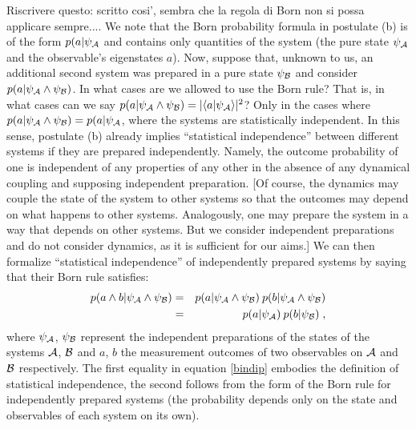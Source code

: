 \documentclass[aps,prl,amsmath,amssymb,twocolumn]{revtex4}
\theoremstyle{plain}
\theoremstyle{definition}
\theoremstyle{remark}
\def\>{\rangle}
\def\<{\langle}
\def\labell#1{\label{#1}}
\begin{document}
	Riscrivere questo: scritto cosi', sembra che la regola di Born non si possa applicare sempre....
	We note that the Born
	probability formula in postulate (b) is of the form $p(a|\psi_{\cal A}$ and contains only quantities of the
	system (the pure state $\psi_{\cal A}$ and the observable's eigenstates $a$). Now, suppose that, unknown to us, an additional second system was prepared in a pure state $\psi_{\cal B}$ and consider $p(a|\psi_{\cal A}\wedge \psi_{\cal B})$. In what cases are we allowed to use the Born rule? That is, in what cases can we say $p(a|\psi_{\cal A}\wedge \psi_{\cal B}) = |\<a|\psi_{\cal A}\>|^2$? Only in the cases where $p(a|\psi_{\cal A}\wedge \psi_{\cal B}) = p(a|\psi_{\cal A}$, where the systems  are statistically independent. In this sense, postulate (b) already implies  ``statistical independence'' between
	different systems if they are prepared independently. Namely, the
	outcome probability of one is independent of any properties of any
	other in the absence of any dynamical coupling and supposing
	independent preparation. [Of course, the dynamics may couple the state
	of the system to other systems so that the outcomes may depend on what
	happens to other systems.  Analogously, one may prepare the system in
	a way that depends on other systems. But we consider independent
	preparations and do not consider dynamics, as it is sufficient for our
	aims.] We can then formalize ``statistical independence'' of
	independently prepared systems by saying that their Born rule
	satisfies:
	\begin{eqnarray}
	p(a\wedge b|\psi_{\cal A}\wedge \psi_{\cal B})&=&p(a|\psi_{\cal A}\wedge \psi_{\cal
		B})\:p(b|\psi_{\cal A}\wedge \psi_{\cal B})\nonumber\\&=& p(a|\psi_{\cal
		A})\:p(b|\psi_{\cal B})
	\labell{bindip}\;,
	\end{eqnarray}
	where $\psi_{\cal A}$, $\psi_{\cal B}$ represent the independent
	preparations of the states of the systems $\cal A$, $\cal B$ and $a$,
	$b$ the measurement outcomes of two observables on $\cal A$ and $\cal
	B$ respectively. The first equality in equation \eqref{bindip} embodies the
	definition of statistical independence, the second follows from the
	form of the Born rule for independently prepared systems (the
	probability depends only on the state and observables of each system
	on its own).
	
\end{document}
